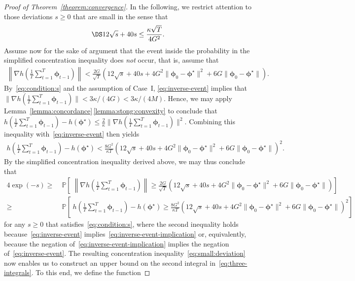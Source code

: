 \documentclass[11pt, a4paper, oneside, reqno]{article}
\begin{document}
\begin{proof} [Proof of Theorem~\ref{theorem:convergence}]
		
	    In the following, we restrict attention to those deviations $s\ge 0$ that are small in the sense that
		\begin{align}
		    \label{eq:condition:s}
		    \DS 12 \sqrt{s} + 40 s \leq \frac{ \kappa \sqrt{T}}{4G^2}.
		\end{align}
		Assume now for the sake of argument that the event inside the probability in the simplified concentration inequality does {\em not} occur, that is, assume that
		\begin{align}
		    \label{eq:inverse-event}
		    \left\| \nabla h \left(\frac{1}{T} \sum_{t=1}^{T} \bm \phi_{t-1} \right) \right\| 
    	    < \frac{2G}{\sqrt{T}} \left( 12 \sqrt{s} + 40 s + 4 G^2 \| \bm \phi_0 - \bm \phi^\star \|^2 + 6 G \| \bm \phi_0 - \bm \phi^\star \| \right).
		\end{align}
		By~\eqref{eq:condition:s} and the assumption of Case~I, \eqref{eq:inverse-event} implies that $\| \nabla h ( \frac{1}{T}\sum_{t=1}^T \bm \phi_{t-1} ) \| < 3 \kappa / (4G) < 3 \kappa / (4M)$. Hence, we may apply Lemma~\ref{lemma:concordance}\,\ref{lemma:stong:convexity} to conclude that $h ( \frac{1}{T}\sum_{t=1}^T \bm \phi_{t-1} ) - h(\bm \phi^\star) \leq \frac{2}{\kappa} \| \nabla h ( \frac{1}{T} \sum_{t=1}^T \bm \phi_{t-1} ) \|^2$. Combining this inequality with~\eqref{eq:inverse-event} then yields
		\begin{align}
		\label{eq:inverse-event-implication}
		    h \left( \frac{1}{T}\sum_{t=1}^T \bm \phi_{t-1} \right) - h(\bm \phi^\star) < \frac{8G^2}{\kappa T} \left( 12 \sqrt{s} + 40 s + 4 G^2 \| \bm \phi_0 - \bm \phi^\star \|^2 + 6 G \| \bm \phi_0 - \bm \phi^\star \| \right)^2.
		\end{align}
		By the simplified concentration inequality derived above, we may thus conclude that
		\begin{align}
		\nonumber
		    4 \exp(-s) \geq \; &\mathbb P \left[ \; \left\| \nabla h \left(\frac{1}{T} \sum_{t=1}^{T} \bm \phi_{t-1} \right) \right\| 
    	    \geq \frac{2G}{\sqrt{T}} \left( 12 \sqrt{s} + 40 s + 4 G^2 \| \bm \phi_0 - \bm \phi^\star \|^2 + 6 G \| \bm \phi_0 - \bm \phi^\star \| \right) \right] \\
    	    \geq \; & \mathbb P \left[ \; h \left(\frac{1}{T} \sum_{t=1}^{T} \bm \phi_{t-1} \right) - h(\bm \phi^\star) \geq \frac{8G^2}{\kappa T} \left( 12 \sqrt{s} + 40 s + 4 G^2 \| \bm \phi_0 - \bm \phi^\star \|^2 + 6 G \| \bm \phi_0 - \bm \phi^\star \| \right)^2 \right]
    	    \label{eq:small:deviation}
		\end{align}
		for any $s\ge 0$ that satisfies~\eqref{eq:condition:s}, where the second inequality holds because~\eqref{eq:inverse-event} implies~\eqref{eq:inverse-event-implication} or, equivalently, because the negation of~\eqref{eq:inverse-event-implication} implies the negation of~\eqref{eq:inverse-event}. The resulting concentration inequality~\eqref{eq:small:deviation} now enables us to construct an upper bound on the second integral in~\eqref{eq:three-integrals}. To this end, we define the function

\end{proof}
\end{document}
